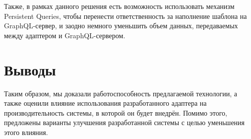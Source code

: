 Также, в рамках данного решения есть возможность использовать механизм Persistent Queries\cite{graphql-persistent-queries}, чтобы перенести ответственность за наполнение шаблона на GraphQL-сервер, и заодно немного уменьшить объем данных, передаваемых между адаптером и GraphQL-сервером.


\section{Выводы} \label{sec:ch4-conclusion}

Таким образом, мы доказали работоспособность предлагаемой технологии, а также оценили влияние использования разработанного адаптера на производительность системы, в которой он будет внедрён.
Помимо этого, предложены варианты улучшения разработанной системы с целью уменьшения этого влияния.


